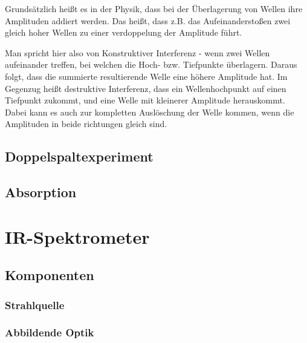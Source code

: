 \documentclass{article}
\begin{document}
Grundsätzlich heißt es in der Physik, dass bei der Überlagerung von Wellen ihre Amplituden addiert werden. Das heißt, dass z.B. das Aufeinanderstoßen zwei gleich hoher Wellen zu einer verdoppelung der Amplitude führt.

Man spricht hier also von Konstruktiver Interferenz - wenn zwei Wellen aufeinander treffen, bei welchen die Hoch- bzw. Tiefpunkte überlagern. Daraus folgt, dass die summierte resultierende Welle eine höhere Amplitude hat. Im Gegenzug heißt destruktive Interferenz, dass ein Wellenhochpunkt auf einen Tiefpunkt zukommt, und eine Welle mit kleinerer Amplitude herauskommt. Dabei kann es auch zur kompletten Auslöschung der Welle kommen, wenn die Amplituden in beide richtungen gleich sind.


\subsection{Doppelspaltexperiment}


\subsection{Absorption}


\section{IR-Spektrometer}


\subsection{Komponenten}

\subsubsection{Strahlquelle}


\subsubsection{Abbildende Optik}

\end{document}
